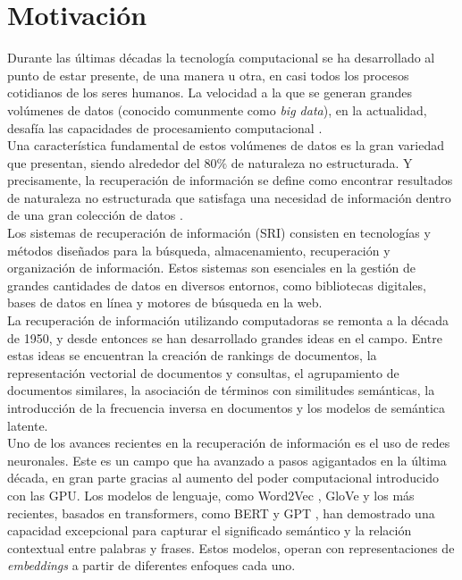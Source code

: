 \section{Motivación}
Durante las últimas décadas la tecnología computacional se ha desarrollado al punto de estar presente, de una manera u otra, en casi todos los procesos cotidianos de los seres humanos. La velocidad a la que se generan grandes volúmenes de datos (conocido comunmente como \textit{big data}), en la actualidad, desafía las capacidades de procesamiento computacional \cite{RiseofBigData}.\\
Una característica fundamental de estos volúmenes de datos es la gran variedad que presentan, siendo alrededor del 80$\%$ de naturaleza no estructurada. Y precisamente, la recuperación de información se define como encontrar resultados de naturaleza no estructurada que satisfaga una necesidad de información dentro de una gran colección de datos \cite{manning2008introductiontoIR}.\\
Los sistemas de recuperación de información (SRI) consisten en tecnologías y métodos diseñados para la búsqueda, almacenamiento, recuperación y organización de información. Estos sistemas son esenciales en la gestión de grandes cantidades de datos en diversos entornos, como bibliotecas digitales, bases de datos en línea y motores de búsqueda en la web.\\ 
La recuperación de información utilizando computadoras  se remonta a la década de 1950, y desde entonces se han desarrollado grandes ideas en el campo. Entre estas ideas se encuentran la creación de rankings de documentos, la representación vectorial de documentos y consultas, el agrupamiento de documentos similares, la asociación de términos con similitudes semánticas, la introducción de la frecuencia inversa en documentos y los modelos de semántica latente.\cite{SRIConf1}\\
Uno de los avances recientes en la recuperación de información es el uso de redes neuronales. Este es un campo que ha avanzado a pasos agigantados en la última década, en gran parte gracias al aumento del poder computacional introducido con las GPU. Los modelos de lenguaje, como Word2Vec \cite{Mikolov2013EfficientEO}, GloVe \cite{Pennington2014GloVeGV} y los más recientes, basados en transformers, como BERT \cite{Devlin2019BERTPO} y GPT \cite{Radford2018ImprovingLU}, han demostrado una capacidad excepcional para capturar el significado semántico y la relación contextual entre palabras y frases. Estos modelos, operan con representaciones de \textit{embeddings} a partir de diferentes enfoques cada uno.\\
